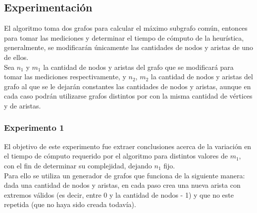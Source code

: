 \subsection{Experimentación}
\noindent El algoritmo toma dos grafos para calcular el máximo subgrafo común, entonces para tomar las mediciones y determinar el tiempo de cómputo de la heurística, generalmente, se modificarán únicamente las cantidades de nodos y aristas de uno de ellos. \\
Sea $n_1$ y $m_1$ la cantidad de nodos y aristas del grafo que se modificará para tomar las mediciones respectivamente, y $n_2$, $m_2$ la cantidad de nodos y aristas del grafo al que se le dejarán constantes las cantidades de nodos y aristas, aunque en cada caso podrán utilizarse grafos distintos por con la misma cantidad de vértices y de aristas.
    
\subsubsection*{Experimento 1}\;
\noindent  El objetivo de este experimento fue extraer conclusiones acerca de la variación en el tiempo de cómputo requerido por el algoritmo para distintos valores de $m_1$, con el fin de determinar su complejidad, dejando $n_1$ fijo. \\
\noindent Para ello se utiliza un generador de grafos que funciona de la siguiente manera: dada una cantidad de nodos y aristas, en cada paso crea una nueva arista con extremos válidos (es decir, entre 0 y la cantidad de nodos - 1) y que no este repetida (que no haya sido creada todavía).
     	
